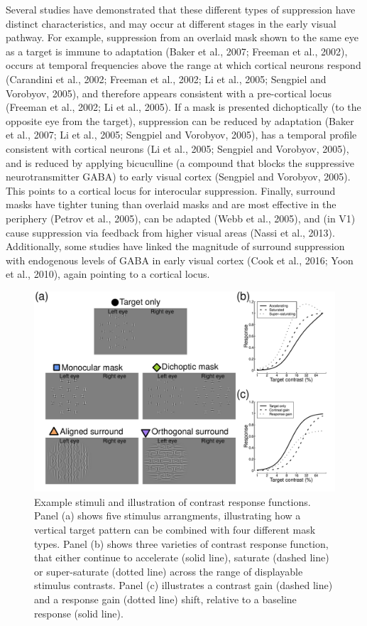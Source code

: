 \documentclass[]{article}
\begin{document}
Several studies have demonstrated that these different types of suppression have distinct characteristics, and may occur at different stages in the early visual pathway. For example, suppression from an overlaid mask shown to the same eye as a target is immune to adaptation (Baker et al., 2007; Freeman et al., 2002), occurs at temporal frequencies above the range at which cortical neurons respond (Carandini et al., 2002; Freeman et al., 2002; Li et al., 2005; Sengpiel and Vorobyov, 2005), and therefore appears consistent with a pre-cortical locus (Freeman et al., 2002; Li et al., 2005). If a mask is presented dichoptically (to the opposite eye from the target), suppression can be reduced by adaptation (Baker et al., 2007; Li et al., 2005; Sengpiel and Vorobyov, 2005), has a temporal profile consistent with cortical neurons (Li et al., 2005; Sengpiel and Vorobyov, 2005), and is reduced by applying bicuculline (a compound that blocks the suppressive neurotransmitter GABA) to early visual cortex (Sengpiel and Vorobyov, 2005). This points to a cortical locus for interocular suppression. Finally, surround masks have tighter tuning than overlaid masks and are most effective in the periphery (Petrov et al., 2005), can be adapted (Webb et al., 2005), and (in V1) cause suppression via feedback from higher visual areas (Nassi et al., 2013). Additionally, some studies have linked the magnitude of surround suppression with endogenous levels of GABA in early visual cortex (Cook et al., 2016; Yoon et al., 2010), again pointing to a cortical locus.

\begin{figure}

{\centering \includegraphics{figures/stimfig} 

}

\caption{Example stimuli and illustration of contrast response functions. Panel (a) shows five stimulus arrangments, illustrating how a vertical target pattern can be combined with four different mask types. Panel (b) shows three varieties of contrast response function, that either continue to accelerate (solid line), saturate (dashed line) or super-saturate (dotted line) across the range of displayable stimulus contrasts. Panel (c) illustrates a contrast gain (dashed line) and a response gain (dotted line) shift, relative to a baseline response (solid line).}\label{fig:stimfig}
\end{figure}
\end{document}

